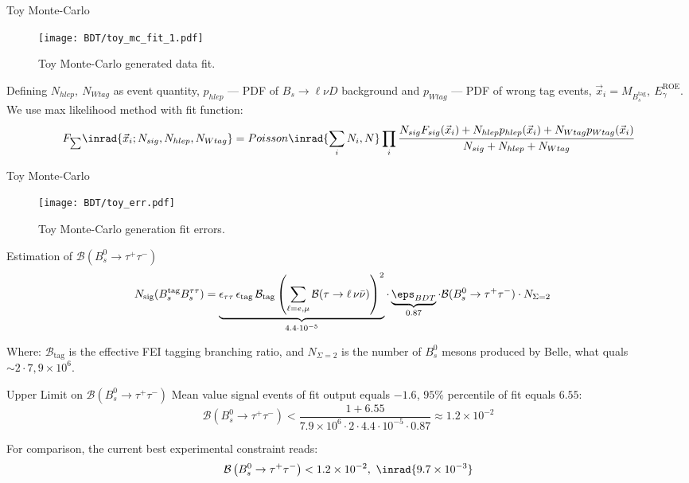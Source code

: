 \begin{frame}{Toy Monte-Carlo}
    \begin{figure}
        \centering
        \texttt{[image: BDT/toy\_mc\_fit\_1.pdf]}
        \caption{Toy Monte-Carlo generated data fit.}
        \label{toy}
    \end{figure}     
    \small{
    Defining $N_{hlep}, \ N_{Wtag}$ as event quantity, $p_{hlep}$ --- PDF of $B_s \to \ell \nu D$ background and $p_{Wtag}$ --- PDF of wrong tag events, $\Vec x_i = M_{B_s^{\mathrm{tag}}},\ E_\gamma^{\mathrm{ROE}}$. We use max likelihood method with fit function:
    \begin{equation*}
        F_{\sum}\inrad{\Vec x_i; N_{sig}, N_{hlep}, N_{Wtag}} = Poisson\inrad{\sum_i N_i, N}\prod_i \cfrac{N_{sig} F_{sig}(\Vec x_i) + N_{hlep} p_{hlep}(\Vec x_i) + N_{Wtag} p_{Wtag}(\Vec x_i)}{N_{sig} + N_{hlep} + N_{Wtag}}
    \end{equation*}}
\end{frame}

\begin{frame}{Toy Monte-Carlo}
    \begin{figure}
        \centering
        \texttt{[image: BDT/toy\_err.pdf]}
        \caption{Toy Monte-Carlo generation fit errors.}
        \label{toy}
    \end{figure}      
\end{frame}

\begin{frame}{Estimation of $\mathcal{B}(B_s^0 \to \tau^+ \tau^-)$}
    \begin{align*}
        N_{\text{sig}}(B_s^{\text{tag}} B_s^{\tau\tau}) &= 
        \underbrace{\epsilon_{\tau\tau} \, \epsilon_{\text{tag}} \, \mathcal{B}_{\text{tag}} \left( \sum_{\ell=e,\mu} \mathcal{B}(\tau \to \ell \, \nu \bar{\nu}) \right)^2}_{4.4 \cdot 10^{-5}} \cdot \underbrace{\eps_{BDT}}_{0.87}
        \cdot \mathcal{B}(B_s^0 \to \tau^+ \tau^-) \cdot N_{\Sigma=2}
    \end{align*}

    Where: $\mathcal{B}_{\text{tag}}$ is the effective FEI tagging branching ratio, and $N_{\Sigma=2}$ is the number of $B_s^0 $ mesons produced by Belle, what quals $\sim 2 \cdot 7,9 \times 10^6$.

\end{frame}


\begin{frame}{Upper Limit on $\mathcal{B}(B_s^0 \to \tau^+ \tau^-)$}
    Mean value signal events of fit output equals $-1.6$, $95\%$ percentile of fit equals $6.55$:
    \[
    \mathcal{B}\left(B_s^0 \to \tau^+ \tau^-\right) < 
    \frac{1+6.55}{7.9 \times 10^6 \cdot 2 \cdot 4.4 \cdot 10^{-5}  \cdot 0.87}
    \approx 1.2 \times 10^{-2}
    \]

    For comparison, the current best experimental constraint reads:
    \begin{equation*}
        \mathcal{B}\left(B_s^0 \to \tau^+ \tau^-\right) < 1.2 \times 10^{-2},\ \inrad{9.7 \times 10^{-3}}
    \end{equation*}

\end{frame}

